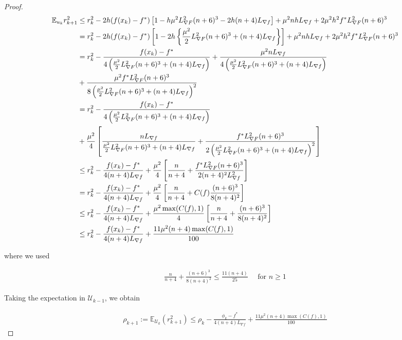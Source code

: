 \documentclass{article}
\begin{document}
\begin{theorem}
\begin{proof}
\begin{align}
\mathbb{E}_{u_k}r_{k+1}^2 & \leq r_k^2 -2h(f(x_k)-f^*)\left[1 - h\mu^2 L_{\nabla F}^2(n+6)^3 - 2h(n+4)L_{\nabla f}\right] + \mu^2 nhL_{\nabla f} + 2\mu^2h^2f^*L_{\nabla F}^2(n+6)^3 \notag \\ & = r_k^2 -2h(f(x_k)-f^*)\left[1 - 2h\left\{\frac{\mu^2}{2}L_{\nabla F}^2(n+6)^3 + (n+4)L_{\nabla f}\right\}\right] + \mu^2nhL_{\nabla f} + 2\mu^2h^2f^*L_{\nabla F}^2(n+6)^3 \notag \\ & = r_k^2 - \frac{f(x_k) - f^*}{4\left(\frac{\mu^2}{2}L_{\nabla F}^2(n+6)^3 + (n+4)L_{\nabla f}\right)} + \frac{\mu^2 n L_{\nabla f}}{4\left(\frac{\mu^2}{2}L_{\nabla F}^2(n+6)^3 + (n+4)L_{\nabla f}\right)} \notag  \\ & + \frac{\mu^2f^*L_{\nabla F}^2(n+6)^3}{8\left(\frac{\mu^2}{2}L_{\nabla F}^2(n+6)^3 + (n+4)L_{\nabla f}\right)^2} \notag \\ & = r_k^2 - \frac{f(x_k) - f^*}{4\left(\frac{\mu^2}{2}L_{\nabla F}^2(n+6)^3 + (n+4)L_{\nabla f}\right)} \notag \\ & + \frac{\mu^2}{4}\left[\frac{nL_{\nabla f}}{\frac{\mu^2}{2}L_{\nabla F}^2(n+6)^3 + (n+4)L_{\nabla f}} + \frac{f^*L_{\nabla F}^2(n+6)^3}{2\left(\frac{\mu^2}{2}L_{\nabla F}^2(n+6)^3 + (n+4)L_{\nabla f}\right)^2}\right] \notag \\ & \leq r_k^2 - \frac{f(x_k) - f^*}{4(n+4)L_{\nabla f}} + \frac{\mu^2}{4}\left[\frac{n}{n+4} + \frac{f^*L_{\nabla F}^2(n+6)^3}{2(n+4)^2L_{\nabla f}^2}\right] \notag \\ & = r_k^2 - \frac{f(x_k) - f^*}{4(n+4)L_{\nabla f}} + \frac{\mu^2}{4}\left[\frac{n}{n+4} + C(f)\frac{(n+6)^3}{8(n+4)^2}\right] \notag  \\ & \leq r_k^2 - \frac{f(x_k)-f^*}{4(n+4)L_{\nabla f}} + \frac{\mu^2\max(C(f),1)}{4}\left[\frac{n}{n+4} + \frac{(n+6)^3}{8(n+4)^2}\right] \notag \\ & \leq r_k^2 - \frac{f(x_k) - f^*}{4(n+4)L_{\nabla f}} + \frac{11\mu^2(n+4)\max(C(f),1)}{100} \label{August10_convergence_analysis_4}
\end{align}

where we used 

\begin{align*}
\frac{n}{n+4} + \frac{(n+6)^3}{8(n+4)^2} \leq \frac{11(n+4)}{25} \quad \text{ for } n \geq 1
\end{align*}

Taking the expectation in $\mathcal{U}_{k-1}$, we obtain

\begin{align*}
\rho_{k+1}:= \mathbb{E}_{\mathcal{U}_k}(r_{k+1}^2) \leq \rho_k - \frac{\phi_k - f^*}{4(n+4)L_{\nabla f}} + \frac{11\mu^2(n+4)\max(C(f),1)}{100}
\end{align*}



\end{proof}
\end{theorem}
\end{document}
